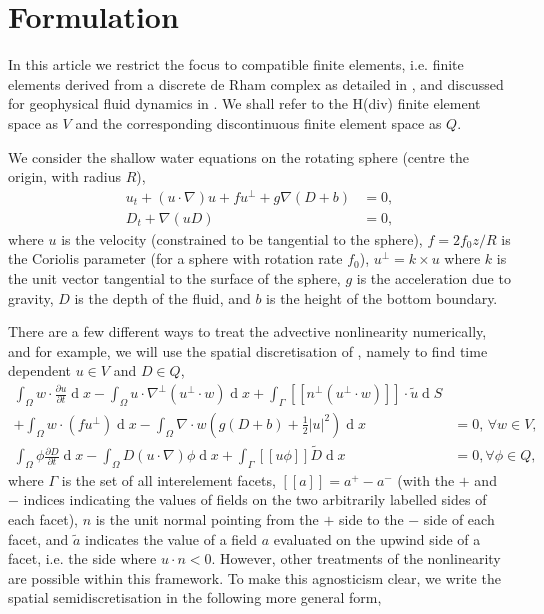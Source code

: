 \documentclass[pdflatex,sn-mathphys]{sn-jnl}%
\theoremstyle{thmstyleone}%
\theoremstyle{thmstyletwo}%
\theoremstyle{thmstylethree}%
\newcommand{\pp}[2]{\frac{\partial #1}{\partial #2}}
\DeclareMathOperator{\diff}{d}
\newcommand{\jump}[1]{[\![ #1]\!]}
\begin{document}
\section{Formulation}\label{sec:formul}

In this article we restrict the focus to compatible finite elements,
i.e. finite elements derived from a discrete de Rham complex as
detailed in \citet{arnold2006finite,arnold2018finite}, and discussed
for geophysical fluid dynamics in
\citet{cotter2012mixed,gibson2019compatible}. We shall refer to the
H(div) finite element space as $V$ and the corresponding discontinuous
finite element space as $Q$.

We consider the shallow water equations on the rotating sphere (centre
the origin, with radius $R$),
\begin{align}
  u_t + (u\cdot \nabla)u + fu^{\perp} + g\nabla (D+b) & = 0, \\
  D_t + \nabla(uD) & = 0,
\end{align}
where $u$ is the velocity (constrained to be tangential to the
sphere), $f=2f_0 z/R$ is the Coriolis parameter (for a sphere with
rotation rate $f_0$), $u^{\perp}=k\times u$ where $k$ is the unit
vector tangential to the surface of the sphere, $g$ is the
acceleration due to gravity, $D$ is the depth of the fluid, and $b$ is
the height of the bottom boundary.

There are a few different ways to treat the advective nonlinearity
numerically, and for example, we will use the spatial discretisation
of \citet{gibson2019compatible}, namely to find time dependent
$u\in V$ and $D\in Q$, 
\begin{align}
  \int_{\Omega}{w}\cdot\pp{{u}}{t}\diff x
  - \int_\Omega {u}\cdot\nabla^\perp ({u}^\perp\cdot{w})\diff x
  + \int_\Gamma\jump{{n}^\perp({u}^\perp\cdot{w})}\cdot\widetilde{{u}}\diff S\nonumber\\
  + \int_\Omega{w}\cdot (f{u}^\perp) \diff x
  - \int_{\Omega}\nabla\cdot{w} \left(g(D + b)
  + \frac{1}{2}|{u}|^2 \right)\diff x &=0,\, \forall w\in V, \label{eq:weakVISWE-A}\\
  \int_{\Omega}\phi\pp{D}{t}\diff x - \int_{\Omega}D({u}\cdot\nabla)\phi\diff x
  + \int_{\Gamma} \jump{{u}\phi}\widetilde{D}\diff x
  &= 0,\label{eq:weakVISWE-B} \forall \phi \in Q,
\end{align}
where $\Gamma$ is the set of all interelement facets,
$\jump{a}=a^+-a^-$ (with the $+$ and $-$ indices indicating the values
of fields on the two arbitrarily labelled sides of each facet), $n$ is
the unit normal pointing from the $+$ side to the $-$ side of each
facet, and $\tilde{a}$ indicates the value of a field $a$ evaluated on
the upwind side of a facet, i.e. the side where ${u}\cdot{n}<
0$. However, other treatments of the nonlinearity are possible within
this framework.  To make this agnosticism clear, we write the spatial
semidiscretisation in the following more general form,
\end{document}
